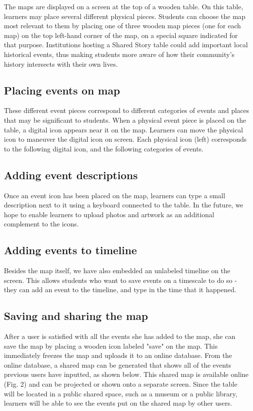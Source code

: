 \documentclass{sigchi-ext}
\begin{document}
The maps are displayed on a screen at the top of a wooden table. On this table, learners may place several different physical pieces. Students can choose the map most relevant to them by placing one of three wooden map pieces (one for each map) on the top left-hand corner of the map, on a special square indicated for that purpose. Institutions hosting a Shared Story table could add important local historical events, thus making students more aware of how their community's history intersects with their own lives. 

\subsection{Placing events on map}

These different event pieces correspond to different categories of events and places that may be significant to students. When a physical event piece  is placed on the table, a digital icon appears near it on the map. Learners can move the physical icon to maneuver the digital icon on screen. Each physical icon (left) corresponds to the following digital icon, and the following categories of events.

\subsection{Adding event descriptions}

Once an event icon has been placed on the map, learners can type a small description next to it using a keyboard connected to the table. In the future, we hope to enable learners to upload photos and artwork as an additional complement to the icons. 

\subsection{Adding events to timeline}

Besides the map itself, we have also embedded an unlabeled timeline on the screen. This allows students who want to save events on a timescale to do so - they can add an event to the timeline, and type in the time that it happened.

\subsection{Saving and sharing the map}

After a user is satisfied with all the events she has added to the map, she can save the map by placing a wooden icon labeled "save" on the map. This immediately freezes the map and uploads it to an online database. From the online database, a shared map can be generated that shows all of the events previous users have inputted, as shown below. This shared map is available online (Fig. 2) and can be projected or shown onto a separate screen. Since the table will be located in a public shared space, such as a museum or a public library, learners will be able to see the events put on the shared map by other users.
\end{document}
